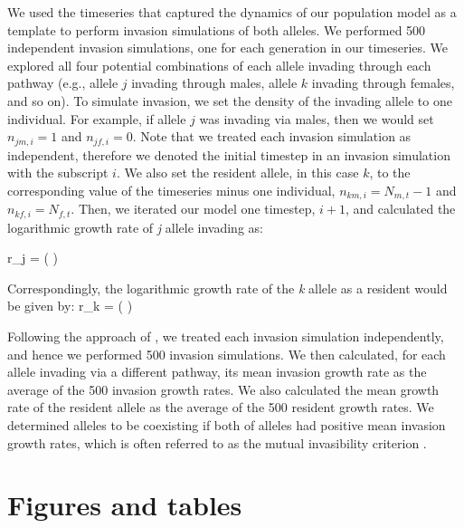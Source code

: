 \documentclass[12pt]{article}
\let\oldequation\equation
\let\oldendequation\endequation
\renewenvironment{equation}
  {\linenomathNonumbers\oldequation}
  {\oldendequation\endlinenomath}
\begin{document}
We used the timeseries that captured the dynamics of our population model as a template to perform invasion simulations of both alleles. We performed 500 independent invasion simulations, one for each generation in our timeseries. We explored all four potential combinations of each allele invading through each pathway (e.g., allele $j$ invading through males, allele $k$ invading through females, and so on). To simulate invasion, we set the density of the invading allele to one individual. For example, if allele $j$ was invading via males, then we would set $n_{jm,i} = 1$ and $n_{jf,i}= 0$. Note that we treated each invasion simulation as independent, therefore we denoted the initial timestep in an invasion simulation with the subscript $i$. We also set the resident allele, in this case $k$, to the corresponding value of the timeseries minus one individual, $n_{km,i} = N_{m,t} -1$ and $n_{kf,i} = N_{f,t}$. Then, we iterated our model one timestep, $i+1$, and calculated the logarithmic growth rate of \textit{j} allele invading as:


\begin{equation}
r_{j} =	\ln \left (  \right )
\label{invader}
\end{equation}

Correspondingly, the logarithmic growth rate of the \textit{k} allele as a resident would be given by:
\begin{equation}
r_{k} =	\ln \left (  \right )
\label{resident}
\end{equation}

Following the approach of \citet{shoemaker2020}, we treated each invasion simulation independently, and hence we performed 500 invasion simulations. We then calculated, for each allele invading via a different pathway, its mean invasion growth rate as the average of the 500 invasion growth rates. We also calculated the mean growth rate of the resident allele as the average of the 500 resident growth rates. We determined alleles to be coexisting if both of alleles had positive mean invasion growth rates, which is often referred to as the mutual invasibility criterion \citep{barabas_chessons_2018}.

\clearpage
\section*{Figures and tables }
\end{document}
